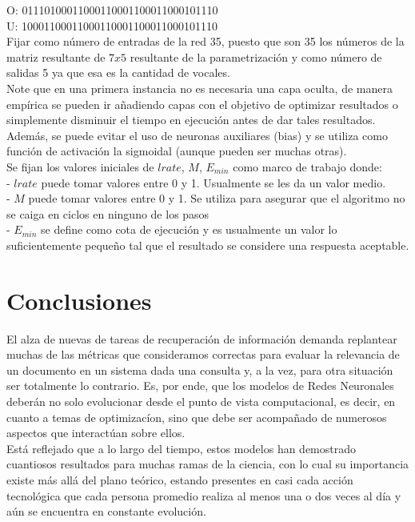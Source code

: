 \documentclass{llncs}
\begin{document}
O: 01110100011000110001100011000101110 \\

U: 10001100011000110001100011000101110 \\

Fijar como n\'umero de entradas de la red 35, puesto que son 35 los n\'umeros de la matriz resultante de $7x5$ resultante de la parametrizaci\'on
y como n\'umero de salidas 5 ya que esa es la cantidad de vocales.\\

Note que en una primera instancia no es necesaria una capa oculta, de manera emp\'irica se pueden ir a\~nadiendo capas con el objetivo de optimizar
resultados o simplemente disminuir el tiempo en ejecuci\'on antes de dar tales resultados. Adem\'as, se puede evitar el uso de neuronas auxiliares (bias)
y se utiliza como funci\'on de activaci\'on la sigmoidal (aunque pueden ser muchas otras). \\
Se fijan los valores iniciales de $lrate$, $M$, $E_{min}$ como marco de trabajo donde:\\
- $lrate$ puede tomar valores entre 0 y 1. Usualmente se les da un valor medio. \\
- $M$ puede tomar valores entre 0 y 1. Se utiliza para asegurar que el algoritmo no se caiga en ciclos en ninguno de los pasos\\
- $E_{min}$ se define como cota de ejecuci\'on y es usualmente un valor lo suficientemente peque\~no tal que el resultado se considere una respuesta aceptable.

\section{Conclusiones}

El alza de nuevas de tareas de recuperaci\'on de informaci\'on demanda replantear muchas de las m\'etricas que consideramos correctas para evaluar la relevancia
de un documento en un sistema dada una consulta y, a la vez, para otra situaci\'on ser totalmente lo contrario. Es, por ende, que los modelos de Redes Neuronales
deber\'an no solo evolucionar desde el punto de vista computacional, es decir, en cuanto a temas de optimizac\'ion, sino que debe ser acompa\~nado de numerosos
aspectos que interac\-t\'uan sobre ellos. \\
Est\'a reflejado que a lo largo del tiempo, estos modelos han demostrado cuantiosos resultados para muchas ramas de la ciencia, con lo cual su importancia existe
m\'as all\'a del plano te\'orico, estando presentes en casi cada acci\'on tecnol\'ogica que cada persona promedio realiza al menos una o dos veces al d\'ia y a\'un se
encuentra en constante evoluci\'on.
\end{document}
